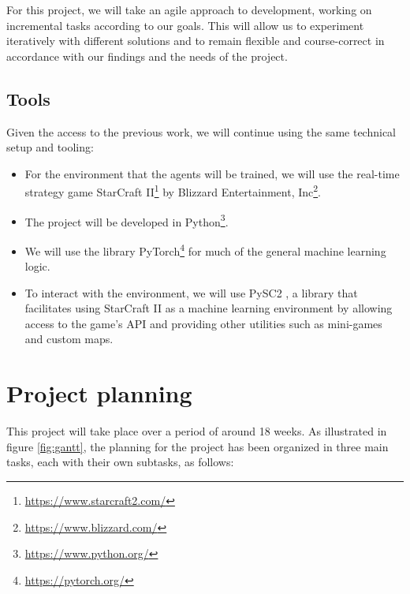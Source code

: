 For this project, we will take an agile approach to development, working on incremental tasks according to our goals. This will allow us to experiment iteratively with different solutions and to remain flexible and course-correct in accordance with our findings and the needs of the project.

\subsection{Tools}
\label{section:tools}

Given the access to the previous work, we will continue using the same technical setup and tooling:

\begin{itemize}
    \item For the environment that the agents will be trained, we will use the real-time strategy game StarCraft II\footnote{\url{https://www.starcraft2.com/}} by Blizzard Entertainment, Inc\footnote{\url{https://www.blizzard.com/}}.
    \item The project will be developed in Python\footnote{\url{https://www.python.org/}}.
    \item We will use the library PyTorch\footnote{\url{https://pytorch.org/}} for much of the general machine learning logic.
    \item To interact with the environment, we will use PySC2 \cite{Vinyals:2017}, a library that facilitates using StarCraft II as a machine learning environment by allowing access to the game's API and providing other utilities such as mini-games and custom maps.
\end{itemize} 

\section{Project planning}

This project will take place over a period of around 18 weeks. As illustrated in figure \ref{fig:gantt}, the planning for the project has been organized in three main tasks, each with their own subtasks, as follows:


